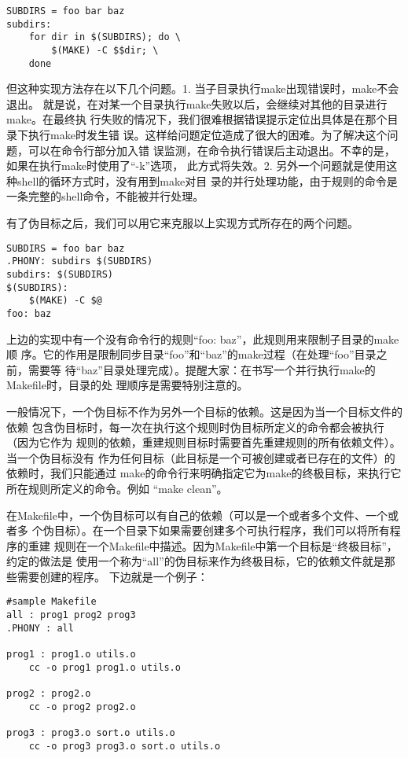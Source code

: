 \begin{Verbatim}[]
SUBDIRS = foo bar baz
subdirs:
    for dir in $(SUBDIRS); do \
        $(MAKE) -C $$dir; \
    done
\end{Verbatim}

但这种实现方法存在以下几个问题。1. 当子目录执行make出现错误时，make不会退出。
就是说，在对某一个目录执行make失败以后，会继续对其他的目录进行make。在最终执
行失败的情况下，我们很难根据错误提示定位出具体是在那个目录下执行make时发生错
误。这样给问题定位造成了很大的困难。为了解决这个问题，可以在命令行部分加入错
误监测，在命令执行错误后主动退出。不幸的是，如果在执行make时使用了“-k”选项，
此方式将失效。2. 另外一个问题就是使用这种shell的循环方式时，没有用到make对目
录的并行处理功能，由于规则的命令是一条完整的shell命令，不能被并行处理。

有了伪目标之后，我们可以用它来克服以上实现方式所存在的两个问题。
\begin{Verbatim}[]
SUBDIRS = foo bar baz
.PHONY: subdirs $(SUBDIRS)
subdirs: $(SUBDIRS)
$(SUBDIRS):
    $(MAKE) -C $@
foo: baz
\end{Verbatim}

上边的实现中有一个没有命令行的规则“foo: baz”，此规则用来限制子目录的make顺
序。它的作用是限制同步目录“foo”和“baz”的make过程（在处理“foo”目录之前，需要等
待“baz”目录处理完成）。提醒大家：在书写一个并行执行make的Makefile时，目录的处
理顺序是需要特别注意的。

一般情况下，一个伪目标不作为另外一个目标的依赖。这是因为当一个目标文件的依赖
包含伪目标时，每一次在执行这个规则时伪目标所定义的命令都会被执行（因为它作为
规则的依赖，重建规则目标时需要首先重建规则的所有依赖文件）。当一个伪目标没有
作为任何目标（此目标是一个可被创建或者已存在的文件）的依赖时，我们只能通过
make的命令行来明确指定它为make的终极目标，来执行它所在规则所定义的命令。例如
“make clean”。

在Makefile中，一个伪目标可以有自己的依赖（可以是一个或者多个文件、一个或者多
个伪目标）。在一个目录下如果需要创建多个可执行程序，我们可以将所有程序的重建
规则在一个Makefile中描述。因为Makefile中第一个目标是“终极目标”，约定的做法是
使用一个称为“all”的伪目标来作为终极目标，它的依赖文件就是那些需要创建的程序。
下边就是一个例子：

\begin{Verbatim}[]
#sample Makefile
all : prog1 prog2 prog3
.PHONY : all

prog1 : prog1.o utils.o
    cc -o prog1 prog1.o utils.o

prog2 : prog2.o
    cc -o prog2 prog2.o

prog3 : prog3.o sort.o utils.o
    cc -o prog3 prog3.o sort.o utils.o
\end{Verbatim}

